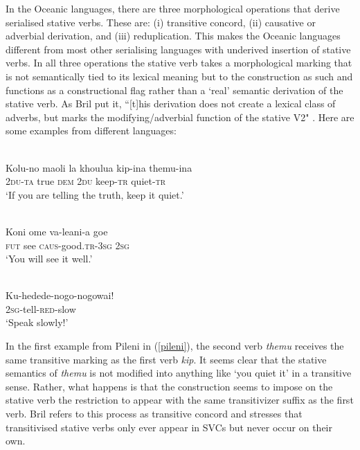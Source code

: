 In the Oceanic languages, there are three morphological operations that derive serialised stative verbs. These are: (i) transitive concord, (ii) causative or adverbial derivation, and (iii) reduplication. This makes the Oceanic languages different from most other serialising languages with underived insertion of stative verbs. In all three operations the stative verb takes a morphological marking that is not semantically tied to its lexical meaning but to the construction as such and functions as a constructional flag rather than a `real' semantic derivation of the stative verb. As Bril put it, ``[t]his derivation does not create a lexical class of adverbs, but marks the modifying/adverbial function of the stative V2" \citep[273]{bril2007nexus}. Here are some examples from different languages:

\ea \label{pileni}
\\
\gll Kolu-no maoli la khoulua kip-ina themu-ina \\
\textsc{2}\textsc{du}-\textsc{ta} true \textsc{dem} \textsc{2}\textsc{du} keep-\textsc{tr} quiet-\textsc{tr} \\
\glft `If you are telling the truth, keep it quiet.’\\ 
\z

\ea \label{hoava}
\\
\gll Koni ome va-leani-a goe \\
\textsc{fut} see \textsc{caus}-good.\textsc{tr}-\textsc{3}\textsc{sg} \textsc{2}\textsc{sg} \\
\glft `You will see it well.’\\ 
\z

\ea \label{saliba}
\\
\gll Ku-hedede-nogo-nogowai! \\
\textsc{2}\textsc{sg}-tell-\textsc{red}-slow \\
\glft `Speak slowly!’\\ 
\z

In the first example from Pileni in (\ref{pileni}), the second verb \textit{themu} receives the same transitive marking as the first verb \textit{kip}. It seems clear that the stative semantics of \textit{themu} is not modified into anything like `you quiet it' in a transitive sense. Rather, what happens is that the construction seems to impose on the stative verb the restriction to appear with the same transitivizer suffix as the first verb. Bril refers to this process as transitive concord and stresses that transitivised stative verbs only ever appear in SVCs but never occur on their own.

